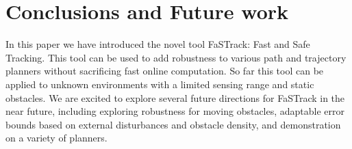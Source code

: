\section{Conclusions and Future work}
In this paper we have introduced the novel tool {FaSTrack}: Fast and Safe Tracking. This tool can be used to add robustness to various path and trajectory planners without sacrificing fast online computation. So far this tool can be applied to unknown environments with a limited sensing range and static obstacles. We are excited to explore several future directions for FaSTrack in the near future, including exploring robustness for moving obstacles, adaptable error bounds based on external disturbances and obstacle density, and demonstration on a variety of planners.
